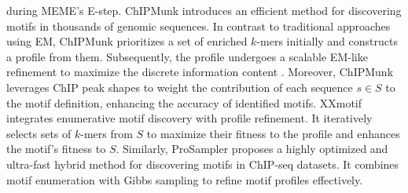 \documentclass[a4paper, titlepage, openright]{book}
\begin{document}
during MEME's E-step. ChIPMunk \citep{kulakovskiy2010deep} introduces an efficient method for discovering motifs in thousands of genomic sequences. In contrast to traditional approaches using EM, ChIPMunk prioritizes a set of enriched $k$-mers initially and constructs a profile from them. Subsequently, the profile undergoes a scalable EM-like refinement to maximize the discrete information content \citep{kulakovskiy2009discovery}. Moreover, ChIPMunk leverages ChIP peak shapes to weight the contribution of each sequence $s \in S$ to the motif definition, enhancing the accuracy of identified motifs. XXmotif \citep{hartmann2013p} integrates enumerative motif discovery with profile refinement. It iteratively selects sets of $k$-mers from $S$ to maximize their fitness to the profile and enhances the motif's fitness to $S$. Similarly, ProSampler \citep{li2019prosampler} proposes a highly optimized and ultra-fast hybrid method for discovering motifs in ChIP-seq datasets. It combines motif enumeration with Gibbs sampling to refine motif profiles effectively.

\end{document}
